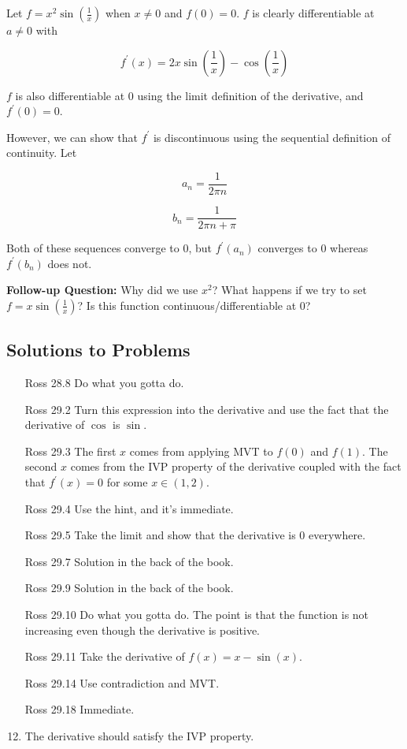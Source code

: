 \documentclass{article}
\theoremstyle{definition}
\newcommand{\fdiff}{f^{\prime}}
\begin{document}
Let $f = x^{2}\sin(\frac{1}{x})$ when $x \neq 0$ and $f(0) = 0$. 
$f$ is clearly differentiable at $a \neq 0$ with 

\[ \fdiff(x) = 2x \sin(\frac{1}{x}) - \cos(\frac{1}{x})\]

$f$ is also differentiable at $0$ using the limit definition of the derivative,
and $\fdiff(0) = 0$.

However, we can show that $\fdiff$ is discontinuous using the sequential
definition of continuity. Let 

\[ a_{n} = \frac{1}{2 \pi n}\] 

\[ b_{n} = \frac{1}{2 \pi n + \pi}\] 

Both of these sequences converge to $0$, but $\fdiff(a_{n}) $ converges to 
$0$ whereas $\fdiff(b_{n})$ does not.

\textbf{Follow-up Question:} Why did we use $x^{2}$? What happens if
we try to set $f = x \sin(\frac{1}{x})$? Is this function continuous/differentiable
at $0$?

\subsection{Solutions to Problems}

\begin{enumerate}
    \item [Ross 28.8] Do what you gotta do.
    \item[Ross 29.2] Turn this expression into the derivative and use the fact that
    the derivative of $\cos$ is $\sin$.
    \item[Ross 29.3] The first $x$ comes from applying MVT to $f(0)$ and $f(1)$. The second
    $x$ comes from the IVP property of the derivative coupled with the fact that 
    $\fdiff(x) = 0$ for some $x \in (1,2)$.
    \item[Ross 29.4] Use the hint, and it's immediate.
    \item[Ross 29.5] Take the limit and show that the derivative is $0$ everywhere.
    \item[Ross 29.7] Solution in the back of the book.
    \item[Ross 29.9] Solution in the back of the book.
    \item[Ross 29.10] Do what you gotta do. The point is that the function
    is not increasing even though the derivative is positive.
    \item[Ross 29.11] Take the derivative of $f(x) = x - \sin(x)$.
    \item[Ross 29.14] Use contradiction and MVT.
    \item[Ross 29.18] Immediate.
    \item The derivative should satisfy the IVP property.
\end{enumerate}
\end{document}
